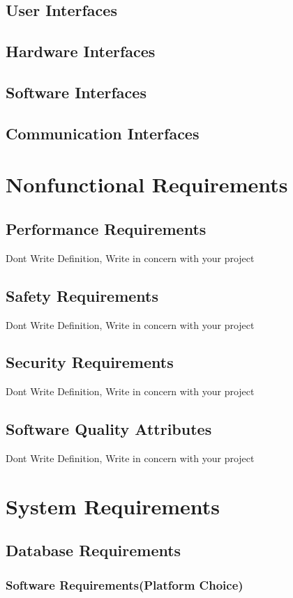 \documentclass[oneside,a4paper,12pt]{report}
\begin{document}
\subsection{User Interfaces}
\subsection{Hardware Interfaces}
\subsection{Software Interfaces}
\subsection{ Communication Interfaces}

\section{Nonfunctional Requirements}  
\subsection{Performance Requirements} 
Dont Write Definition, Write in concern with your project 
\subsection{Safety Requirements}
Dont Write Definition, Write in concern with your project 
\subsection{Security Requirements }
Dont Write Definition, Write in concern with your project 
\subsection{Software Quality Attributes }
Dont Write Definition, Write in concern with your project 
\section{System  Requirements }  
 
\subsection{Database Requirements}  
\subsubsection{Software Requirements(Platform Choice)}
\end{document}
